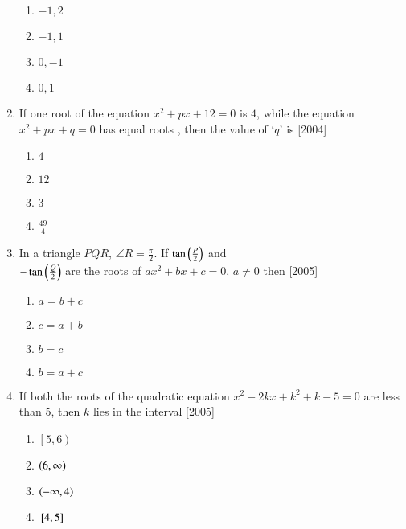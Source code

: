 \documentclass[journal,12pt,twocolumn]{IEEEtran}
\theoremstyle{remark}
\begin{document}
\begin{enumerate}
\begin{enumerate}

	\item  $-1,2$
	\item  $-1,1$
	\item  $0,-1$
	\item  $0,1$

\end{enumerate}

\item If one root of the equation $x^2 + px + 12 = 0$ is $4$, while the equation  $x^2 + px + q = 0$ has equal roots , then the value of `$q$' is
\hfill[2004]

\begin{enumerate}

	\item  $4$
	\item  $12$
	\item  $3$
	\item  $\frac{49}{4}$

\end{enumerate}

\item In a triangle $PQR$, $\angle R = \frac{\pi}{2}$. If $ \tan\left(\frac{P}{2}\right)$ and \\
	$- \tan\left(\frac{Q}{2}\right)$ are the roots of $ax^2 + bx + c = 0$, $a \neq 0$ then
\hfill[2005]

\begin{enumerate}


	\item  $a = b + c$
	\item  $c = a + b$
	\item  $b = c$
	\item  $b = a + c$

\end{enumerate}

\item If both the roots of the quadratic equation  $x^2 - 2kx + k^2 + k - 5 = 0$ are less than $5$, then $k$ lies in the interval
\hfill[2005]

\begin{enumerate}

	\item  $\left[ 5, 6 \right)$
	\item  $\left(6,\infty\right)$
	\item  $\left(- \infty,4\right)$
	\item  ${}\left[4,5\right]$

\end{enumerate}


\end{enumerate}
\end{document}
